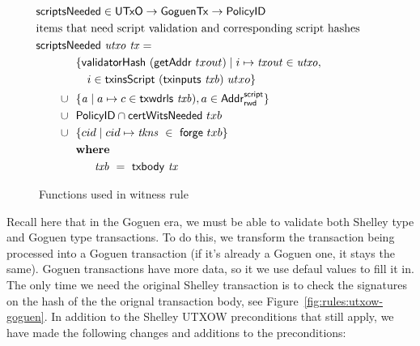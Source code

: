\begin{figure}[htb]
  \begin{align*}
      & \hspace{-1cm}\fun{scriptsNeeded} \in \UTxO \to \GoguenTx \to
        \PolicyID\\
      & \hspace{-1cm}\text{items that need script validation and corresponding script hashes} \\
      &  \hspace{-1cm}\fun{scriptsNeeded}~\var{utxo}~\var{tx} = \\
      & ~~\{ \fun{validatorHash}~(\fun{getAddr}~{txout}) \mid i \mapsto \var{txout} \in \var{utxo},\\
      & ~~~~~i\in\fun{txinsScript}~{(\fun{txinputs}~\var{txb})}~{utxo}\} \\
      \cup & ~~\{ \var{a} \mid a \mapsto c \in \fun{txwdrls}~\var{txb}),
         a\in \AddrRWDScr \} \\
        \cup & ~~\PolicyID \cap \fun{certWitsNeeded}~{txb} \\
        \cup & ~~\{ cid \mid cid \mapsto \var{tkns}~\in~\fun{forge}~{txb} \} \\
      & \where \\
      & ~~~~~~~ \var{txb}~=~\txbody{tx} \\
  \end{align*}
  \caption{Functions used in witness rule}
  \label{fig:functions-witnesses}
\end{figure}

Recall here that in the Goguen era, we must be able to validate both Shelley type
and Goguen type transactions. To do this, we transform the transaction being processed
into a Goguen transaction (if it's already a Goguen one, it stays the same).
Goguen transactions have more data, so it we use defaul values to fill it in.
The only time we need the original Shelley transaction is to check the signatures
on the hash of the the orignal transaction body, see
Figure~\ref{fig:rules:utxow-goguen}. In addition to the Shelley UTXOW preconditions
that still apply, we have made the following changes and additions to the
preconditions:

